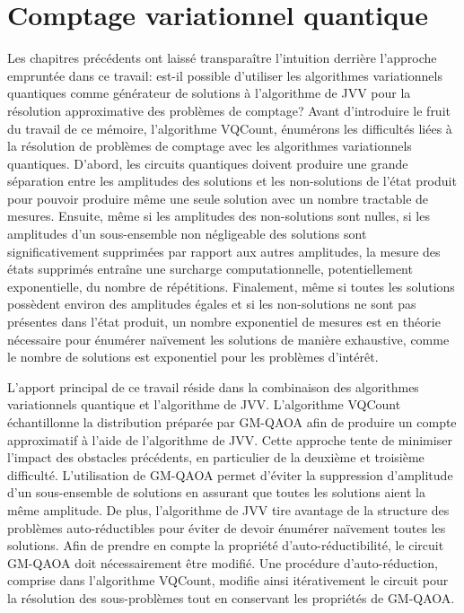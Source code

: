 \chapter{Comptage variationnel quantique}
\label{cha:comptage-variationnel-quantique}


Les chapitres précédents ont laissé transparaître l'intuition derrière l'approche empruntée dans ce travail: est-il possible d'utiliser les algorithmes variationnels quantiques comme générateur de solutions à l'algorithme de JVV pour la résolution approximative des problèmes de comptage? Avant d'introduire le fruit du travail de ce mémoire, l'algorithme VQCount, énumérons les difficultés liées à la résolution de problèmes de comptage avec les algorithmes variationnels quantiques. D'abord, les circuits quantiques doivent produire une grande séparation entre les amplitudes des solutions et les non-solutions de l'état produit pour pouvoir produire même une seule solution avec un nombre tractable de mesures. Ensuite, même si les amplitudes des non-solutions sont nulles, si les amplitudes d'un sous-ensemble non négligeable des solutions sont significativement supprimées par rapport aux autres amplitudes, la mesure des états supprimés entraîne une surcharge computationnelle, potentiellement exponentielle, du nombre de répétitions. Finalement, même si toutes les solutions possèdent environ des amplitudes égales et si les non-solutions ne sont pas présentes dans l'état produit, un nombre exponentiel de mesures est en théorie nécessaire pour énumérer naïvement les solutions de manière exhaustive, comme le nombre de solutions est exponentiel pour les problèmes d'intérêt.

L'apport principal de ce travail réside dans la combinaison des algorithmes variationnels quantique et l'algorithme de JVV. L'algorithme VQCount échantillonne la distribution préparée par GM-QAOA afin de produire un compte approximatif à l'aide de l'algorithme de JVV. Cette approche tente de minimiser l'impact des obstacles précédents, en particulier de la deuxième et troisième difficulté. L'utilisation de GM-QAOA permet d'éviter la suppression d'amplitude d'un sous-ensemble de solutions en assurant que toutes les solutions aient la même amplitude. De plus, l'algorithme de JVV tire avantage de la structure des problèmes auto-réductibles pour éviter de devoir énumérer naïvement toutes les solutions. Afin de prendre en compte la propriété d'auto-réductibilité, le circuit GM-QAOA doit nécessairement être modifié. Une procédure d'auto-réduction, comprise dans l'algorithme VQCount, modifie ainsi itérativement le circuit pour la résolution des sous-problèmes tout en conservant les propriétés de GM-QAOA.


